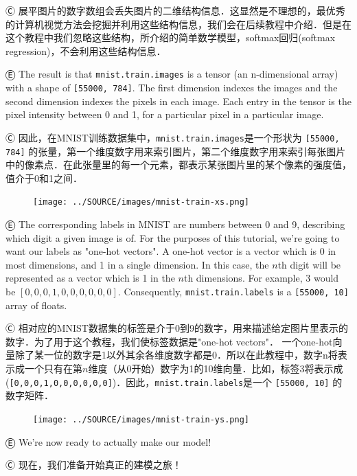 Ⓒ 展平图片的数字数组会丢失图片的二维结构信息．这显然是不理想的，最优秀的计算机视觉方法会挖掘并利用这些结构信息，我们会在后续教程中介绍．但是在这个教程中我们忽略这些结构，所介绍的简单数学模型，softmax回归(softmax regression)，不会利用这些结构信息．

Ⓔ \textcolor{etc}{The result is that \lstinline{mnist.train.images} is a tensor (an n-dimensional array) with a shape of \lstinline{[55000, 784]}. The first dimension indexes the images and the second dimension indexes the pixels in each image. Each entry in the tensor is the pixel intensity between 0 and 1, for a particular pixel in a particular image.}

Ⓒ 因此，在MNIST训练数据集中，\lstinline{mnist.train.images}是一个形状为 \lstinline{[55000, 784]} 的张量，第一个维度数字用来索引图片，第二个维度数字用来索引每张图片中的像素点．在此张量里的每一个元素，都表示某张图片里的某个像素的强度值，值介于0和1之间．

\begin{figure}[htbp]
\centering
\texttt{[image: ../SOURCE/images/mnist-train-xs.png]}
\caption{}
\end{figure}

Ⓔ \textcolor{etc}{The corresponding labels in MNIST are numbers between 0 and 9, describing which digit a given image is of. For the purposes of this tutorial, we're going to want our labels as "one-hot vectors". A one-hot vector is a vector which is 0 in most dimensions, and 1 in a single dimension. In this case, the $n$th digit will be represented as a vector which is 1 in the $n$th dimensions. For example, 3 would be $[0,0,0,1,0,0,0,0,0,0]$. Consequently, \lstinline{mnist.train.labels} is a \lstinline{[55000, 10]} array of floats.}

Ⓒ 相对应的MNIST数据集的标签是介于0到9的数字，用来描述给定图片里表示的数字．为了用于这个教程，我们使标签数据是"one-hot vectors"． 一个one-hot向量除了某一位的数字是1以外其余各维度数字都是0．所以在此教程中，数字n将表示成一个只有在第$n$维度（从0开始）数字为1的10维向量．比如，标签3将表示成(\lstinline{[0,0,0,1,0,0,0,0,0,0]})．因此，\lstinline{mnist.train.labels}是一个 \lstinline{[55000, 10]} 的数字矩阵．

\begin{figure}[htbp]
\centering
\texttt{[image: ../SOURCE/images/mnist-train-ys.png]}
\caption{}
\end{figure}

Ⓔ \textcolor{etc}{We're now ready to actually make our model!}

Ⓒ 现在，我们准备开始真正的建模之旅！

